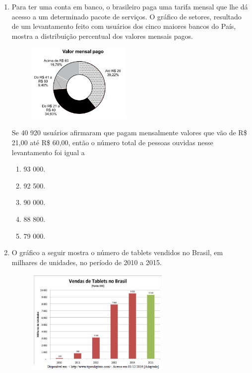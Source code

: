 \documentclass[twocolumn,oneside,a4paper,10pt]{article}
\begin{document}
\begin{enumerate}
\begin{enumerate}
\end{enumerate}

\item

Para ter uma conta em banco, o brasileiro paga uma tarifa mensal que lhe dá acesso a um determinado pacote de serviços. O gráfico de setores, resultado de um levantamento feito com usuários dos cinco maiores bancos do País, mostra a distribuição percentual dos valores mensais pagos.

\begin{figure}[!htb]
\center
\includegraphics[width=5cm]{Figuras/g5.png}
\end{figure}

\newpage
Se 40 920 usuários afirmaram que pagam mensalmente valores que vão de R\$ 21,00 até R\$ 60,00, então o número total de pessoas ouvidas nesse levantamento foi igual a

\begin{enumerate}
\item 93 000.
\item 92 500.
\item 90 000.
\item 88 800.
\item 79 000.
\end{enumerate}

\item O gráfico a seguir mostra o número de tablets vendidos no Brasil, em milhares de unidades, no período de 2010 a 2015.

\begin{figure}[!htb]
\center
\includegraphics[width=7cm]{Figuras/g6.png}
\end{figure}



\end{enumerate}
\end{document}
